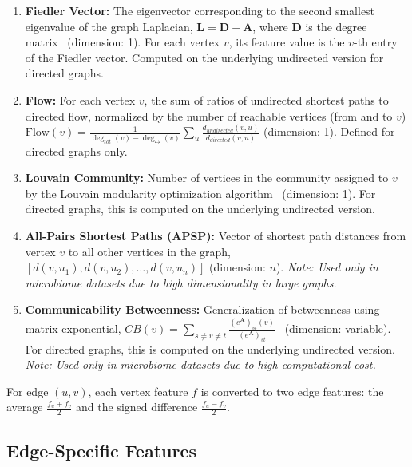 \documentclass{article}
\begin{document}
\begin{enumerate}
        \item \textbf{Fiedler Vector:} The eigenvector corresponding to the second smallest eigenvalue of the graph Laplacian, $\mathbf{L}= \mathbf{D}- \mathbf{A}$, where $\mathbf{D}$ is the degree matrix~\citep{fiedler1975property} (dimension: 1). For each vertex $v$, its feature value is the $v$-th entry of the Fiedler vector. Computed on the underlying undirected version for directed graphs.

        \item \textbf{Flow:} For each vertex $v$, the sum of ratios of undirected shortest paths to directed flow, normalized by the number of reachable vertices (from and to $v$) $\text{Flow}(v)=\frac{1}{\deg_{tot}(v)- \deg_{\leftrightarrow}(v)}\sum_{u}\frac{d_{undirected}(v,u)}{d_{directed}(v,u)}$ (dimension: 1). Defined for directed graphs only.

        \item \textbf{Louvain Community:} Number of vertices in the community assigned to $v$ by the Louvain modularity optimization algorithm~\citep{blondel2008fast} (dimension: 1). For directed graphs, this is computed on the underlying undirected version.

        \item \textbf{All-Pairs Shortest Paths (APSP):} Vector of shortest path distances from vertex $v$ to all other vertices in the graph, $[d(v,u_{1}), d(v,u_{2}), \ldots, d(v,u_{n})]$ (dimension: $n$). \textit{Note: Used only in microbiome datasets due to high dimensionality in large graphs.}

        \item \textbf{Communicability Betweenness:} Generalization of betweenness using matrix exponential, $CB(v) = \sum_{s \neq v \neq t}\frac{(e^{\mathbf{A}})_{st}(v)}{(e^{\mathbf{A}})_{st}}$~\citep{estrada2009communicability} (dimension: variable). For directed graphs, this is computed on the underlying undirected version. \textit{Note: Used only in microbiome datasets due to high computational cost.}
    \end{enumerate}

    For edge $(u,v)$, each vertex feature $f$ is converted to two edge features: the average $\frac{f_{u}+ f_{v}}{2}$ and the signed difference $\frac{f_{u}- f_{v}}{2}$.

    \subsection*{Edge-Specific Features}
\end{document}
